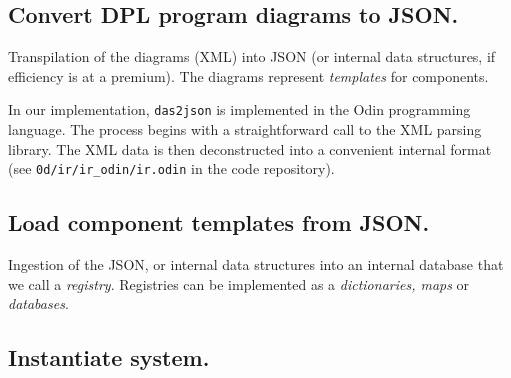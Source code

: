 \documentclass[10pt,anonymous,review]{acmart}
\begin{document}
\subsection{Convert DPL program diagrams to JSON.}


  Transpilation of the diagrams (XML) into JSON (or internal data structures, if efficiency is at a premium). The diagrams represent \emph{templates} for components.
  
  In our implementation, \texttt{das2json} is implemented\cite{d2jrepo} in the Odin programming language. The process begins with a straightforward call to the XML parsing library. The XML data is then deconstructed into a convenient internal format (see \texttt{0d/ir/ir\_odin/ir.odin} in the code repository).
%
  
\subsection{Load component templates from JSON.}
  Ingestion of the JSON, or internal data structures into an internal database that we call a \emph{registry}. Registries can be implemented as a \emph{dictionaries, maps} or \emph{databases}.
%

\subsection{Instantiate system.}
\end{document}
